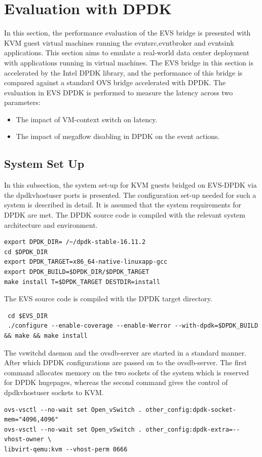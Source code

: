 \section{Evaluation with DPDK}
In this section, the performance evaluation of the EVS bridge is presented with KVM guest virtual machines running the evntsrc,evntbroker and evntsink applications. This section aims to emulate a real-world data center deployment with applications running in virtual machines. The EVS bridge in this section is accelerated by the Intel DPDK library, and the performance of this bridge is compared against a standard OVS bridge accelerated with DPDK. The evaluation in EVS DPDK is performed to measure the latency across two parameters:
\begin{itemize}
 \item The impact of VM-context switch on latency. 
 \item The impact of megaflow disabling in DPDK on the event actions.
\end{itemize}


\subsection{System Set Up}
In this subsection, the system set-up for KVM guests bridged on EVS-DPDK via the dpdkvhostuser ports is presented. The configuration set-up needed for such a system is described in detail. It is assumed that the system requirements for DPDK are met.\newline
The DPDK source code is compiled with the relevant system architecture and environment. 

\begin{lstlisting}
export DPDK_DIR= /~/dpdk-stable-16.11.2
cd $DPDK_DIR
export DPDK_TARGET=x86_64-native-linuxapp-gcc
export DPDK_BUILD=$DPDK_DIR/$DPDK_TARGET
make install T=$DPDK_TARGET DESTDIR=install
\end{lstlisting}

The EVS source code is compiled with the DPDK target directory.
 \begin{lstlisting}
 cd $EVS_DIR
 ./configure --enable-coverage --enable-Werror --with-dpdk=$DPDK_BUILD && make && make install
 \end{lstlisting}

The vswitchd daemon and the ovsdb-server are started in a standard manner. After which DPDK configurations are passed on to the ovsdb-server. The first command allocates memory on the two sockets of the system which is reserved for DPDK hugepages, whereas the second command gives the control of dpdkvhostuser sockets to KVM.
\begin{lstlisting}
ovs-vsctl --no-wait set Open_vSwitch . other_config:dpdk-socket-mem="4096,4096"
ovs-vsctl --no-wait set Open_vSwitch . other_config:dpdk-extra=--vhost-owner \
libvirt-qemu:kvm --vhost-perm 0666
\end{lstlisting}

